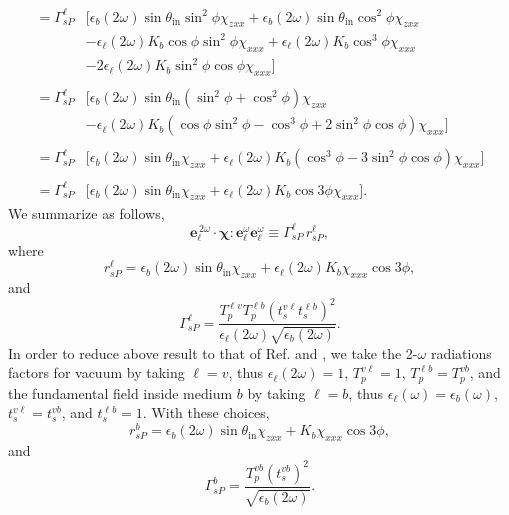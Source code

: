 \begin{equation*}
\begin{split}
= \Gamma^{\ell}_{sP}
&\big[
   \epsilon_{b}(2\omega)\sin\theta_{\mathrm{in}}\sin^{2}\phi\chi_{zxx}
 + \epsilon_{b}(2\omega)\sin\theta_{\mathrm{in}}\cos^{2}\phi\chi_{zxx}\\
&- \epsilon_{\ell}(2\omega)K_{b}\cos\phi\sin^{2}\phi\chi_{xxx}
 + \epsilon_{\ell}(2\omega)K_{b}\cos^{3}\phi\chi_{xxx}\\
&- 2\epsilon_{\ell}(2\omega)K_{b}\sin^{2}\phi\cos\phi\chi_{xxx}
\big]\\\\
= \Gamma^{\ell}_{sP}
&\big[
\epsilon_{b}(2\omega)\sin\theta_{\mathrm{in}}
(\sin^{2}\phi + \cos^{2}\phi)\chi_{zxx}\\
&- \epsilon_{\ell}(2\omega)K_{b}
(\cos\phi\sin^{2}\phi - \cos^{3}\phi + 2\sin^{2}\phi\cos\phi)\chi_{xxx}
\big]\\\\
= \Gamma^{\ell}_{sP}
&\big[
  \epsilon_{b}(2\omega)\sin\theta_{\mathrm{in}}\chi_{zxx} 
+ \epsilon_{\ell}(2\omega)K_{b}(\cos^{3}\phi - 3\sin^{2}\phi\cos\phi)\chi_{xxx}
\big]\\\\
= \Gamma^{\ell}_{sP}
&\big[
  \epsilon_{b}(2\omega)\sin\theta_{\mathrm{in}}\chi_{zxx}
+ \epsilon_{\ell}(2\omega)K_{b}\cos3\phi\chi_{xxx}
\big].
\end{split}
\end{equation*}
We summarize as follows,
\begin{equation*}
\mathbf{e}^{\,2\omega}_{\ell}\cdot
\boldsymbol{\chi}:\mathbf{e}^\omega_{\ell}\mathbf{e}^\omega_{\ell}
\equiv\Gamma^{\ell}_{sP}\, r^{\ell}_{sP},
\end{equation*}
where
\begin{equation*}
r^{\ell}_{sP}
= \epsilon_{b}(2\omega)\sin\theta_{\mathrm{in}}\chi_{zxx}
+ \epsilon_{\ell}(2\omega)K_{b}\chi_{xxx}\cos3\phi,
\end{equation*} 
and  
\begin{equation*}
\Gamma^{\ell}_{sP}=
\frac{T_{p}^{\ell v}T^{\ell b}_{p}\left(t_s^{v\ell}t^{\ell b}_s\right)^2}
     {\epsilon_{\ell}(2\omega)\sqrt{\epsilon_{b}(2\omega)}}.  
\end{equation*} 
In order to reduce above result to that of Ref. \cite{mizrahiJOSA88} and
\cite{sipePRB87},  we take the 2-$\omega$ radiations factors for vacuum by
taking $\ell=v$, thus $\epsilon_{\ell}(2\omega)=1$, $T^{v\ell}_{p}=1$,
$T^{\ell b}_{p}=T^{vb}_{p}$, and the fundamental field inside medium $b$ by
taking $\ell=b$, thus $\epsilon_{\ell}(\omega)=\epsilon_{b}(\omega)$,
$t^{v\ell}_s=t^{vb}_s$, and $t^{\ell b}_s=1$. With these choices,
\begin{equation*}
r^{b}_{sP} = \epsilon_{b}(2\omega)\sin\theta_{\mathrm{in}}\chi_{zxx}
+ K_{b}\chi_{xxx}\cos3\phi,
\end{equation*} 
and 
\begin{equation*}
\Gamma^{b}_{sP} =
\frac{T^{v b}_{p}(t_s^{vb})^{2}}{\sqrt{\epsilon_{b}(2\omega)}}.  
\end{equation*} 


